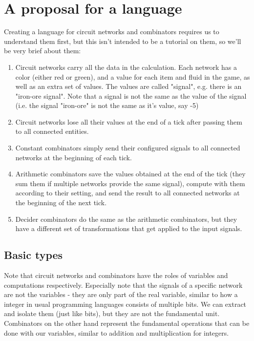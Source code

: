 \documentclass[landscape]{article}
\theoremstyle{plain}
\theoremstyle{definition}
\begin{document}
\section{A proposal for a language}
Creating a language for circuit networks and combinators requires us to understand them first, but this isn't intended to be a tutorial on them, so we'll be very brief about them:
\begin{enumerate}
	\item Circuit networks carry all the data in the calculation. Each network has a color (either red or green), and a value for each item and fluid in the game, as well as an extra set of values. The values are called "signal", e.g. there is an "iron-ore signal". Note that a signal is not the same as the value of the signal (i.e. the signal "iron-ore" is not the same as it's value, say -5)
	\item Circuit networks lose all their values at the end of a tick after passing them to all connected entities.
	\item Constant combinators simply send their configured signals to all connected networks at the beginning of each tick.
	\item Arithmetic combinators save the values obtained at the end of the tick (they sum them if multiple networks provide the same signal), compute with them according to their setting, and send the result to all connected networks at the beginning of the next tick.
	\item Decider combinators do the same as the arithmetic combinators, but they have a different set of transformations that get applied to the input signals.
\end{enumerate}
\subsection{Basic types}
Note that circuit networks and combinators have the roles of variables and computations respectively. Especially note that the signals of a specific network are not the variables - they are only part of the real variable, similar to how a integer in usual programming languages consists of multiple bits. We can extract and isolate them (just like bits), but they are not the fundamental unit. Combinators on the other hand represent the fundamental operations that can be done with our variables, similar to addition and multiplication for integers.
\end{document}
